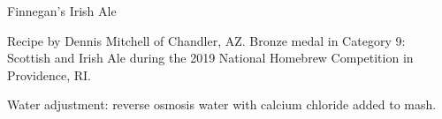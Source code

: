 \begin{recipe}{Finnegan's Irish Ale} %

\begin{aboutblock}
Recipe by Dennis Mitchell of Chandler, AZ. Bronze medal in Category 9: Scottish
and Irish Ale during the 2019 National Homebrew Competition in Providence, RI.
\sourceaha
\end{aboutblock}


\begin{methodandtiming}
 
\begin{mashsteps}
\end{mashsteps}

\begin{fermentationsteps}
\end{fermentationsteps}

\begin{directions}
Water adjustment: reverse osmosis water with  calcium chloride added to
mash.
\end{directions}

\end{methodandtiming}

\recipebreak

\begin{ingredientsblock}

\begin{malts}
\end{malts}

\begin{hops}
\end{hops}


\end{ingredientsblock}

\end{recipe}

